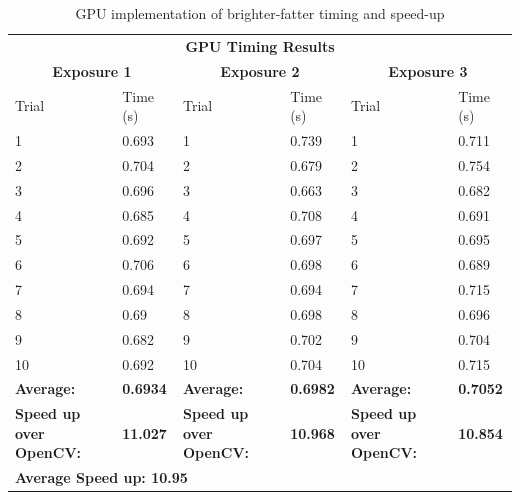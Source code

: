 \documentclass[DM,authoryear,toc]{lsstdoc}
\begin{document}
\begin{table}[h]
\begin{center}
\begin{tabular}{|p{47pt}|p{44pt}|p{45pt}|p{45pt}|p{45pt}|p{45pt}|}
\multicolumn{6}{c}{\textbf{GPU Timing Results}}\\
\multicolumn{2}{c}{\textbf{Exposure 1}} & \multicolumn{2}{c}{\textbf{Exposure 2}} &\multicolumn{2}{c}{\textbf{Exposure 3}}\\ 
\hline
Trial & Time (s) & Trial & Time (s) & Trial & Time (s)\\
\hline
1 & 0.693 & 1 & 0.739 & 1 & 0.711\\
\hline
2 & 0.704 & 2 & 0.679 & 2 & 0.754\\
\hline
3 & 0.696 & 3 & 0.663 & 3 & 0.682\\
\hline
4 & 0.685 & 4 & 0.708 & 4 & 0.691\\
\hline
5 & 0.692 & 5 & 0.697 & 5 & 0.695\\
\hline
6 & 0.706 & 6 & 0.698 & 6 & 0.689\\
\hline
7 & 0.694 & 7 & 0.694 & 7 & 0.715\\
\hline
8 & 0.69 & 8 & 0.698 & 8 & 0.696\\
\hline
9 & 0.682 & 9 & 0.702 & 9 & 0.704\\
\hline
10 & 0.692 & 10 & 0.704 & 10 & 0.715\\
\hline
\textbf{Average:} & \textbf{0.6934} & \textbf{Average:} & \textbf{0.6982} & \textbf{Average:} & \textbf{0.7052}\\
\hline
\textbf{Speed up over OpenCV:} & \textbf{11.027} & \textbf{Speed up over OpenCV:} & \textbf{10.968} & \textbf{Speed up over OpenCV:} & \textbf{10.854}\\
\hline
\multicolumn{3}{l}{\textbf{Average Speed up: 10.95}}&\multicolumn{3}{c}{}\\
\end{tabular}
\caption{\label{tab:gputimes}GPU implementation of brighter-fatter timing and speed-up}
\end{center}
\end{table}
\end{document}
